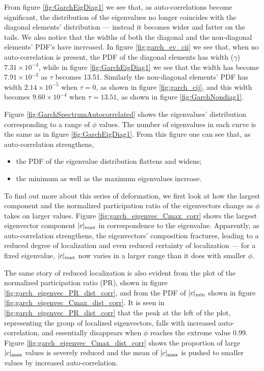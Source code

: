\documentclass{report}
\begin{document}
From figure \ref{fig:GarchEigDiag1} we see that, as auto-correlations
become significant, the distribution of the eigenvalues no longer
coincides with the diagonal elements' distribution --- instead it
becomes wider and fatter on the tails. We also notice that the widths
of both the diagonal and the non-diagonal elements' PDF's have
increased.  In figure \ref{fig:garch_ev_cii} we see that, when no
auto-correlation is present, the PDF of the diagonal elements has
width ($\gamma$) $7.31 \times 10^{-4}$, while in figure
\ref{fig:GarchEigDiag1} we see that the width has become $7.91 \times
10^{-3}$ as $\tau$ becomes 13.51. Similarly the non-diagonal elements'
PDF has width $2.14 \times 10^{-5}$ when $\tau=0$, as shown in figure
\ref{fig:garch_cij}, and this width becomes $9.60 \times 10^{-4}$ when
$\tau = 13.51$, as shown in figure \ref{fig:GarchNondiag1}.

Figure \ref{fig:GarchSpectrumAutocorrelated} shows the eigenvalues'
distribution corresponding to a range of $\phi$ values. The number of
eigenvalues in each curve is the same as in figure
\ref{fig:GarchEigDiag1}.
From this figure one can see that, as auto-correlation strengthens,
\begin{itemize}
\item the PDF of the eigenvalue distribution flattens and widens;
\item the minimum as well as the maximum eigenvalues increase.
\end{itemize}

To find out more about this series of deformation, we first look at
how the largest component and the normalized participation ratio of
the eigenvectors change as $\phi$ takes on larger values. Figure
\ref{fig:garch_eigenvec_Cmax_corr} shows the largest eigenvector
component $|c|_{\text{max}}$ in correspondence to the eigenvalue. Apparently, as
auto-correlation strengthens, the eigenvectors' composition
fractures, leading to a reduced degree of localization and even
reduced certainty of localization --- for a fixed eigenvalue, $|c|_{\text{max}}$
now varies in a larger range than it does with smaller $\phi$.

The same story of reduced localization is also evident from the plot
of the normalized participation ratio (PR), shown in figure
\ref{fig:garch_eigenvec_PR_dist_corr}, and from the PDF of $|c|_{\text{min}}$
shown in figure \ref{fig:garch_eigenvec_Cmax_dist_corr}. It is seen
in \ref{fig:garch_eigenvec_PR_dist_corr} that the peak at the left 
of the plot, representing the group of localized eigenvectors, falls
with increased auto-correlation, and essentially disappears when
$\phi$ reaches the extreme value 0.99. Figure
\ref{fig:garch_eigenvec_Cmax_dist_corr} shows the proportion of large
$|c|_{\text{max}}$ values is severely reduced and the mean of $|c|_{\text{max}}$ is pushed
to smaller values by increased auto-correlation.
\end{document}
